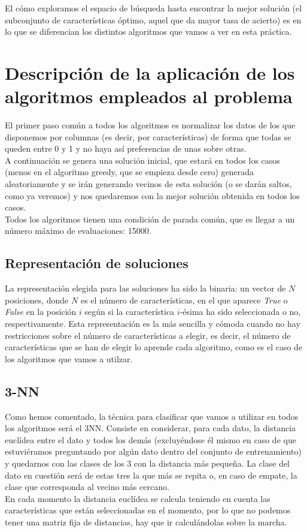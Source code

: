 \documentclass[12pt]{article}
\begin{document}
El cómo exploramos el espacio de búsqueda hasta encontrar la mejor solución (el subconjunto de características óptimo, aquel que da mayor tasa de acierto) es en lo que se diferencian los distintos algoritmos que vamos a ver en esta práctica.

\newpage

\section{Descripción de la aplicación de los algoritmos empleados al problema}
El primer paso común a todos los algoritmos es normalizar los datos de los que disponemos por columnas (es decir, por características) de forma que todas se queden entre 0 y 1 y no haya así preferencias de unas sobre otras.\\

A continuación se genera una solución inicial, que estará en todos los casos (menos en el algoritmo greedy, que se empieza desde cero) generada aleatoriamente y se irán generando vecinos de esta solución (o se darán saltos, como ya veremos) y nos quedaremos con la mejor solución obtenida en todos los casos.\\

Todos los algoritmos tienen una condición de parada común, que es llegar a un número máximo de evaluaciones: 15000.

\subsection{Representación de soluciones}
La representación elegida para las soluciones ha sido la binaria: un vector de $N$ posiciones, donde $N$ es el número de características, en el que aparece \textit{True} o \textit{False} en la posición $i$ según si la característica $i$-ésima ha sido seleccionada o no, respectivamente. Esta representación es la más sencilla y cómoda cuando no hay restricciones sobre el número de características a elegir, es decir, el número de características que se han de elegir lo aprende cada algoritmo, como es el caso de los algoritmos que vamos a utilzar.

\subsection{3-NN}
Como hemos comentado, la técnica para clasificar que vamos a utilizar en todos los algoritmos será el 3NN. Consiste en considerar, para cada dato, la distancia euclídea entre el dato y todos los demás (excluyéndose él mismo en caso de que estuviéramos preguntando por algún dato dentro del conjunto de entrenamiento) y quedarnos con las clases de los 3 con la distancia más pequeña. La clase del dato en cuestión será de estas tres la que más se repita o, en caso de empate, la clase que corresponda al vecino más cercano.\\
En cada momento la distancia euclídea se calcula teniendo en cuenta las características que están seleccionadas en el momento, por lo que no podemos tener una matriz fija de distancias, hay que ir calculándolas sobre la marcha.
\end{document}
